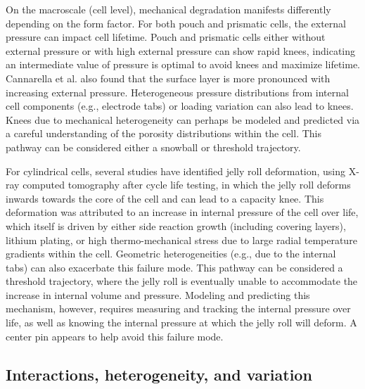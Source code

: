 \documentclass[journal=jpclcd,manuscript=article]{achemso}
\begin{document}
On the macroscale (cell level), mechanical degradation manifests differently depending on the form factor. For both pouch and prismatic cells, the external pressure can impact cell lifetime. Pouch and prismatic cells either without external pressure\cite{wunsch_investigation_2019} or with high external pressure\cite{cannarella_stress_2014} can show rapid knees, indicating an intermediate value of pressure is optimal to avoid knees and maximize lifetime. Cannarella et al.\cite{cannarella_stress_2014} also found that the surface layer is more pronounced with increasing external pressure. Heterogeneous pressure distributions from internal cell components (e.g., electrode tabs) or loading variation\cite{beck_inhomogeneities_2021} can also lead to knees. Knees due to mechanical heterogeneity can perhaps be modeled and predicted via a careful understanding of the porosity distributions within the cell. This pathway can be considered either a snowball or threshold trajectory.

For cylindrical cells, several studies\cite{waldmann_mechanical_2014, pfrang_long-term_2018, pfrang_geometrical_2019, carter_mechanical_2019, kok_virtual_2019} have identified jelly roll deformation, using X-ray computed tomography after cycle life testing, in which the jelly roll deforms inwards towards the core of the cell and can lead to a capacity knee. This deformation was attributed to an increase in internal pressure of the cell over life, which itself is driven by either side reaction growth (including covering layers)\cite{willenberg_development_2020}{}, lithium plating\cite{carter_mechanical_2019}{}, or high thermo-mechanical stress due to large radial temperature gradients within the cell\cite{waldmann_mechanical_2014}{}. Geometric heterogeneities (e.g., due to the internal tabs) can also exacerbate this failure mode.\cite{pfrang_long-term_2018, pfrang_geometrical_2019}
This pathway can be considered a threshold trajectory, where the jelly roll is eventually unable to accommodate the increase in internal volume and pressure. Modeling and predicting this mechanism, however, requires measuring and tracking the internal pressure over life, as well as knowing the internal pressure at which the jelly roll will deform. A center pin appears to help avoid this failure mode.\cite{waldmann_mechanical_2014, carter_mechanical_2019}

\subsection{Interactions, heterogeneity, and variation}
\end{document}

